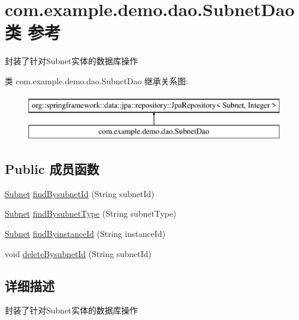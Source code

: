 \hypertarget{interfacecom_1_1example_1_1demo_1_1dao_1_1_subnet_dao}{}\section{com.\+example.\+demo.\+dao.\+Subnet\+Dao类 参考}
\label{interfacecom_1_1example_1_1demo_1_1dao_1_1_subnet_dao}


封装了针对\+Subnet实体的数据库操作  


类 com.\+example.\+demo.\+dao.\+Subnet\+Dao 继承关系图\+:\begin{figure}[H]
\begin{center}
\leavevmode
\includegraphics[height=2.000000cm]{interfacecom_1_1example_1_1demo_1_1dao_1_1_subnet_dao}
\end{center}
\end{figure}
\subsection*{Public 成员函数}
\begin{DoxyCompactItemize}
\item 
\mbox{\hyperlink{classcom_1_1example_1_1demo_1_1modular_1_1_subnet}{Subnet}} \mbox{\hyperlink{interfacecom_1_1example_1_1demo_1_1dao_1_1_subnet_dao_ab29a06feb2d1b1f190597d5e2b796baa}{find\+Bysubnet\+Id}} (String subnet\+Id)
\item 
\mbox{\hyperlink{classcom_1_1example_1_1demo_1_1modular_1_1_subnet}{Subnet}} \mbox{\hyperlink{interfacecom_1_1example_1_1demo_1_1dao_1_1_subnet_dao_ac7f65c2b28e4f923de88aafe4d09f36b}{find\+Bysubnet\+Type}} (String subnet\+Type)
\item 
\mbox{\hyperlink{classcom_1_1example_1_1demo_1_1modular_1_1_subnet}{Subnet}} \mbox{\hyperlink{interfacecom_1_1example_1_1demo_1_1dao_1_1_subnet_dao_ab5e178c48a78a77f757c4f62cacdb46a}{find\+Byinstance\+Id}} (String instance\+Id)
\item 
void \mbox{\hyperlink{interfacecom_1_1example_1_1demo_1_1dao_1_1_subnet_dao_a00f3e6a24cb2b91c1a2cd70fb5904b2b}{delete\+Bysubnet\+Id}} (String subnet\+Id)
\end{DoxyCompactItemize}


\subsection{详细描述}
封装了针对\+Subnet实体的数据库操作 

